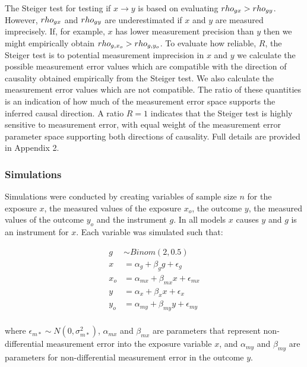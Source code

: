 \documentclass[]{article}
\begin{document}
The Steiger test for testing if \(x \rightarrow y\) is based on
evaluating \(\\rho_{gx} > \\rho_{gy}\). However, \(\\rho_{gx}\) and
\(\\rho_{gy}\) are underestimated if \(x\) and \(y\) are measured
imprecisely. If, for example, \(x\) has lower measurement precision than
\(y\) then we might empirically obtain
\(\\rho_{g,x_o} > \\rho_{g,y_o}\). To evaluate how reliable, \(R\), the
Steiger test is to potential measurement imprecision in \(x\) and \(y\)
we calculate the possible measurement error values which are compatible
with the direction of causality obtained empirically from the Steiger
test. We also calculate the measurement error values which are not
compatible. The ratio of these quantities is an indication of how much
of the measurement error space supports the inferred causal direction. A
ratio \(R=1\) indicates that the Steiger test is highly sensitive to
measurement error, with equal weight of the measurement error parameter
space supporting both directions of causality. Full details are provided
in Appendix 2.

\subsubsection{Simulations}\label{simulations}

Simulations were conducted by creating variables of sample size \(n\)
for the exposure \(x\), the measured values of the exposure \(x_o\), the
outcome \(y\), the measured values of the outcome \(y_o\) and the
instrument \(g\). In all models \(x\) causes \(y\) and \(g\) is an
instrument for \(x\). Each variable was simulated such that:

\[
\begin{aligned}
g & \sim Binom(2, 0.5) \\
x & = \alpha_g + \beta_g g + \epsilon_g \\
x_o & = \alpha_{mx} + \beta_{mx} x + \epsilon_{mx} \\
y & = \alpha_x + \beta_x x + \epsilon_x \\
y_o & = \alpha_{my} + \beta_{my} y + \epsilon_{my} \\
\end{aligned}
\]

where \(\epsilon_{m*} \sim N(0, \sigma^2_{m*})\), \(\alpha_{mx}\) and
\(\beta_{mx}\) are parameters that represent non-differential
measurement error into the exposure variable \(x\), and \(\alpha_{my}\)
and \(\beta_{my}\) are parameters for non-differential measurement error
in the outcome \(y\).
\end{document}

